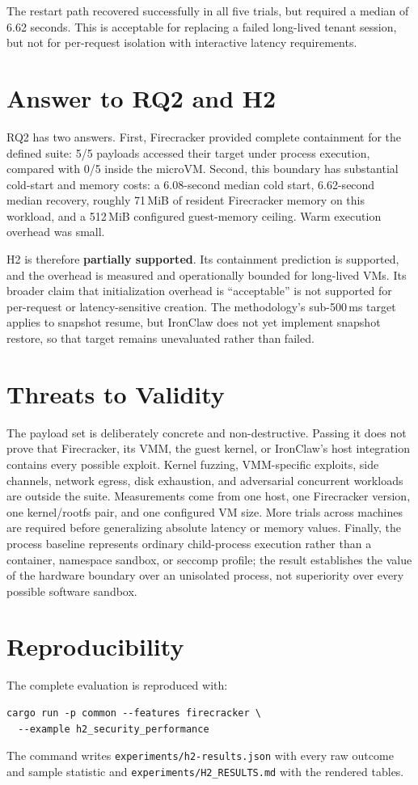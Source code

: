 The restart path recovered successfully in all five trials, but required a median of
6.62 seconds. This is acceptable for replacing a failed long-lived tenant session,
but not for per-request isolation with interactive latency requirements.

\section{Answer to RQ2 and H2}
RQ2 has two answers. First, Firecracker provided complete containment for the defined
suite: 5/5 payloads accessed their target under process execution, compared with 0/5
inside the microVM. Second, this boundary has substantial cold-start and memory costs:
a 6.08-second median cold start, 6.62-second median recovery, roughly 71\,MiB of
resident Firecracker memory on this workload, and a 512\,MiB configured guest-memory
ceiling. Warm execution overhead was small.

H2 is therefore \textbf{partially supported}. Its containment prediction is supported,
and the overhead is measured and operationally bounded for long-lived VMs. Its broader
claim that initialization overhead is ``acceptable'' is not supported for per-request
or latency-sensitive creation. The methodology's sub-500\,ms target applies to snapshot
resume, but IronClaw does not yet implement snapshot restore, so that target remains
unevaluated rather than failed.

\section{Threats to Validity}
The payload set is deliberately concrete and non-destructive. Passing it does not prove
that Firecracker, its VMM, the guest kernel, or IronClaw's host integration contains
every possible exploit. Kernel fuzzing, VMM-specific exploits, side channels, network
egress, disk exhaustion, and adversarial concurrent workloads are outside the suite.
Measurements come from one host, one Firecracker version, one kernel/rootfs pair, and
one configured VM size. More trials across machines are required before generalizing
absolute latency or memory values. Finally, the process baseline represents ordinary
child-process execution rather than a container, namespace sandbox, or seccomp profile;
the result establishes the value of the hardware boundary over an unisolated process,
not superiority over every possible software sandbox.

\section{Reproducibility}
The complete evaluation is reproduced with:
\begin{verbatim}
cargo run -p common --features firecracker \
  --example h2_security_performance
\end{verbatim}
The command writes \texttt{experiments/h2-results.json} with every raw outcome and
sample statistic and \texttt{experiments/H2\_RESULTS.md} with the rendered tables.
